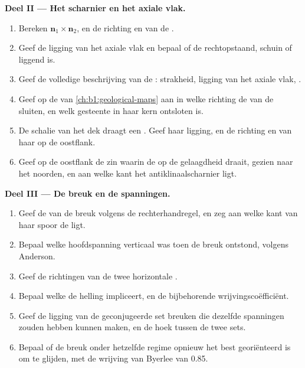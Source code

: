 \begin{problem}
\medskip
\noindent\textbf{Deel II --- Het scharnier en het axiale vlak.}
\begin{enumerate}[resume]
  \item Bereken $\mathbf n_1\times\mathbf n_2$, en de richting en  van de .
  \item Geef de ligging van het axiale vlak en bepaal of de  rechtopstaand, schuin of liggend is.
  \item Geef de volledige beschrijving van de : strakheid, ligging van het axiale vlak, .
  \item Geef op de  van \cref{ch:b1:geological-maps} aan in welke richting de  van de  sluiten, en welk gesteente in haar kern ontsloten is.
  \item De schalie van het dek draagt een . Geef haar ligging, en de richting en  van haar  op de oostflank.
  \item Geef op de oostflank de zin waarin de  op de gelaagdheid draait, gezien naar het noorden, en aan welke kant het antiklinaalscharnier ligt.
\end{enumerate}

\medskip
\noindent\textbf{Deel III --- De breuk en de spanningen.}
\begin{enumerate}[resume]
  \item Geef de  van de breuk volgens de rechterhandregel, en zeg aan welke kant van haar spoor de  ligt.
  \item Bepaal welke hoofdspanning verticaal was toen de breuk ontstond, volgens Anderson.
  \item Geef de richtingen van de twee horizontale .
  \item Bepaal welke  de helling impliceert, en de bijbehorende wrijvingscoëfficiënt.
  \item Geef de ligging van de geconjugeerde set breuken die dezelfde spanningen zouden hebben kunnen maken, en de hoek tussen de twee sets.
  \item Bepaal of de breuk onder hetzelfde regime opnieuw het best georiënteerd is om te glijden, met de wrijving van Byerlee van 0.85.
\end{enumerate}


\end{problem}
